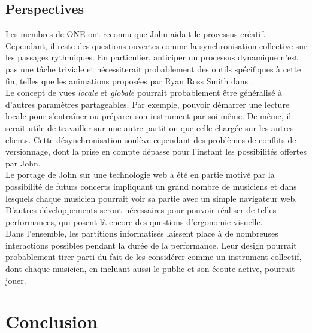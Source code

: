 \subsection{Perspectives}

\noindent Les membres de ONE ont reconnu que John aidait le processus créatif. Cependant, il reste des questions ouvertes comme la synchronisation collective sur les passages rythmiques. En particulier, anticiper un processus dynamique n'est pas une tâche triviale et nécessiterait probablement des outils spécifiques à cette fin, telles que les animations proposées par Ryan Ross Smith dans \cite{smith_atomic_2015}.\\
\indent Le concept de vues \textit{locale} et \textit{globale} pourrait probablement être généralisé à d'autres paramètres partageables. Par exemple, pouvoir démarrer une lecture locale pour s'entraîner ou préparer son instrument par soi-même. De même, il serait utile de travailler sur une autre partition que celle chargée sur les autres clients. Cette désynchronisation soulève cependant des problèmes de conflits de versionnage, dont la prise en compte dépasse pour l'instant les possibilités offertes par John.\\
\indent Le portage de John sur une technologie web a été en partie motivé par la possibilité de futurs concerts impliquant un grand nombre de musiciens et dans lesquels chaque musicien pourrait voir sa partie avec un simple navigateur web. D'autres développements seront nécessaires pour pouvoir réaliser de telles performances, qui posent là-encore des questions d'ergonomie visuelle.\\
\indent Dans l'ensemble, les partitions informatisés laissent place à de nombreuses interactions possibles pendant la durée de la performance. Leur design pourrait probablement tirer parti du fait de les considérer comme un instrument collectif, dont chaque musicien, en incluant aussi le public et son écoute active, pourrait jouer.


\section{Conclusion}

